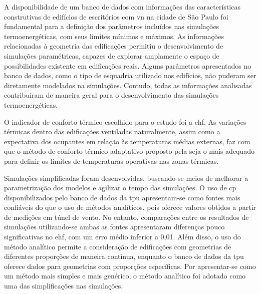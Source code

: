 \documentclass[brazil,hardcopy,openany]{ufscthesis} %
\begin{document}
	A disponibilidade de um banco de dados com informações das características construtivas de edifícios de escritórios com \acrfull{vn} na cidade de São Paulo foi fundamental para a definição dos parâmetros incluídos nas simulações termoenergéticas, com seus limites mínimos e máximos. 
	As informações relacionadas à geometria das edificações permitiu o desenvolvimento de simulações paramétricas, capazes de explorar amplamente o espaço de possibilidades existente em edificações reais.
	Alguns parâmetros apresentados no banco de dados, como o tipo de esquadria utilizado nos edifícios, não puderam ser diretamente modelados na simulações. Contudo, todas as informações analisadas contribuíram de maneira geral para o desenvolvimento das simulações termoenergéticas.
	
	O indicador de conforto térmico escolhido para o estudo foi a \acrfull{ehf}. As variações térmicas dentro das edificações ventiladas naturalmente, assim como a expectativa dos ocupantes em relação às temperaturas médias externas, faz com que o método de conforto térmico adaptativo proposto pela  seja o mais adequado para definir os limites de temperaturas operativas nas zonas térmicas.
	
	Simulações simplificadas foram desenvolvidas, buscando-se meios de melhorar a parametrização dos modelos e agilizar o tempo das simulações.	
	O uso de \acrfull{cp} disponibilizados pelo banco de dados da \acrfull{tpu} apresentam-se como fontes mais confiáveis do que o uso de métodos analíticos, pois oferece valores obtidos a partir de medições em túnel de vento. No entanto, comparações entre os resultados de simulações utilizando-se ambas as fontes apresentaram diferenças pouco significativas no \acrshort{ehf}, com um erro médio inferior a 0,01.
	Além disso, o uso do método analítico permite a consideração de edificações com geometrias de diferentes proporções de maneira contínua, enquanto o banco de dados da \acrshort{tpu} oferece dados para geometrias com proporções específicas.
	Por apresentar-se como um método mais simples e mais genérico, o método analítico foi adotado como uma das simplificações nas simulações.
	
\end{document}
